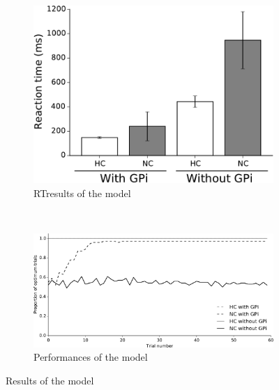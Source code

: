 \begin{figure}[h]
        \centering
        \begin{subfigure}[b]{0.3\textwidth}
                \includegraphics[width=\textwidth]{RTresults}
                \caption{RTresults of the model}
                \label{fig:RTresults}
        \end{subfigure}
        ~ %
          
        \begin{subfigure}[b]{0.5\textwidth}
                \includegraphics[width=\textwidth]{Performances}
                \caption{Performances of the model}
                \label{fig:Performances}
        \end{subfigure}
        \caption{Results of the model}\label{fig:Results}
\end{figure}

